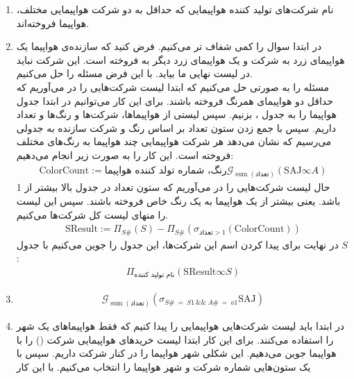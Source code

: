 \begin{enumerate}
    \item نام شرکت‌های تولید کننده هواپیمایی که حداقل به دو شرکت هواپیمایی مختلف، هواپیما فروخته‌اند.
    \item در ابتدا سوال را کمی شفاف تر می‌کنیم. فرض کنید که سازنده‌ی هواپیما
    یک هواپیمای زرد به شرکت
    و یک هواپیمای زرد دیگر به
    فروخته است. این شرکت نباید در لیست نهایی ما بیاید. با این فرض مسئله را حل می‌کنیم.
    \\
    مسئله را به صورتی حل می‌کنیم که ابتدا لیست شرکت‌هایی را در می‌آوریم که حداقل دو هواپیمای همرنگ فروخته باشند.
    برای این کار می‌توانیم در ابتدا جدول هواپیما را به جدول
    ، 
    بزنیم. سپس لیستی از هواپیما‌ها، شرکت‌ها و رنگ‌ها و تعداد داریم. سپس با جمع زدن ستون تعداد بر اساس رنگ و شرکت سازنده
    به جدولی می‌رسیم که نشان می‌دهد هر شرکت هواپیمایی چند هواپیما به رنگ‌های مختلف فروخته است. این کار را به صورت زیر
    انجام می‌دهیم:
    \begin{gather*}
        \text{ColorCount} := \text{رنگ، شماره تولد کننده هواپیما}\mathcal{G}_{\operatorname{sum}(\text{تعداد})}(\text{SAJ} \infty A)
    \end{gather*}
    حال لیست شرکت‌هایی را در می‌آوریم که ستون تعداد در جدول بالا بیشتر از 1 باشد. یعنی بیشتر از یک هواپیما به
    یک رنگ خاص فروخته باشند. سپس این لیست را منهای لیست کل شرکت‌ها می‌کنیم.
    \begin{gather*}
        \text{SResult} := \Pi_{S\#} (S) - \Pi_{S\#}(\sigma_{\text{تعداد} > 1}(\text{ColorCount}))
    \end{gather*}
    در نهایت برای پیدا کردن اسم این شرکت‌ها، این جدول را جوین می‌کنیم با جدول
    $S$:
    \begin{gather*}
        \Pi_{\text{نام تولید کننده}} (\text{SResult} \infty S)
    \end{gather*}
    \item
    \begin{gather*}
        \mathcal{G}_{\operatorname{sum}(\text{تعداد})}(\sigma_{S\# ~ = ~S1 ~ \&\& ~ A\#~=~a1} \text{SAJ})
    \end{gather*}
    \item در ابتدا باید لیست شرکت‌هایی هواپیمایی را پیدا کنیم که فقط هواپیماهای یک شهر را استفاده می‌کنند.
    برای این کار ابتدا لیست خرید‌های هواپیمایی شرکت
    ()
    را با هواپیما جوین می‌دهیم. این شکلی شهر هواپیما را در کنار شرکت داریم. سپس با یک
    ستون‌هایی شماره شرکت و شهر هواپیما را انتخاب می‌کنیم. با این کار

\end{enumerate}
